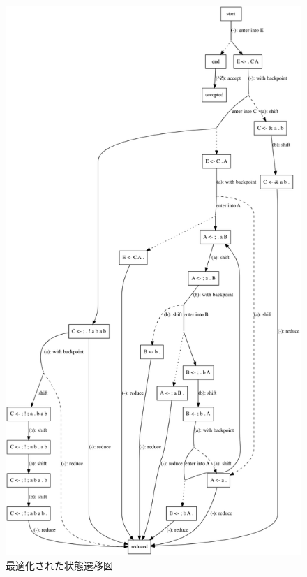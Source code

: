 \begin{figure}
  \centering
  \includegraphics[height=0.9\textheight]{asset/implementation-note-of-peg-parser/sample-grammar-optimized.png}
  \caption{最適化された状態遷移図}
  \label{implementation-note-of-peg-parser:figure:example-optimized}
\end{figure}
